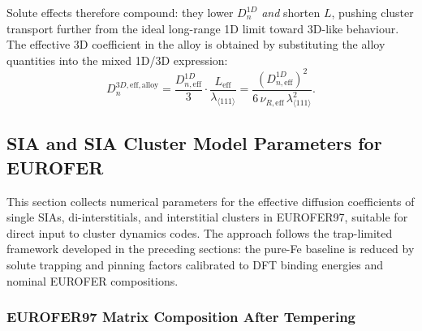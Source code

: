 \documentclass[pdflatex,sn-basic]{sn-jnl} %
\begin{document}
Solute effects therefore compound: they lower $D_n^{1D}$ \emph{and} shorten $L$, pushing cluster transport further from the ideal long-range 1D limit toward 3D-like behaviour. The effective 3D coefficient in the alloy is obtained by substituting the alloy quantities into the mixed 1D/3D expression:
\begin{equation}\label{eq:D3D_eff_alloy}
    D_n^{3D,\mathrm{eff,alloy}} = \frac{D_{n,\mathrm{eff}}^{1D}}{3}\cdot\frac{L_{\mathrm{eff}}}{\lambda_{\langle111\rangle}} = \frac{(D_{n,\mathrm{eff}}^{1D})^2}{6\,\nu_{R,\mathrm{eff}}\,\lambda_{\langle111\rangle}^2}.
\end{equation}

\subsection{SIA and SIA Cluster Model Parameters for EUROFER}
\label{sec:SIA_params_eurofer}

This section collects numerical parameters for the effective diffusion
coefficients of single SIAs, di-interstitials, and interstitial clusters in
EUROFER97, suitable for direct input to cluster dynamics codes. The approach
follows the trap-limited framework developed in the preceding sections: the
pure-Fe baseline is reduced by solute trapping and pinning factors calibrated
to DFT binding energies and nominal EUROFER compositions.

\subsubsection{EUROFER97 Matrix Composition After Tempering}
\end{document}

